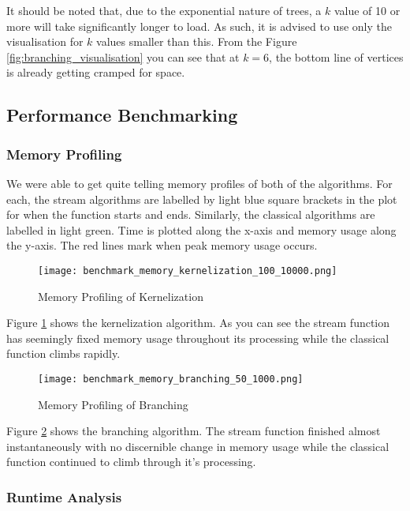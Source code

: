 It should be noted that, due to the exponential nature of trees, a \(k\) value
of 10 or more will take significantly longer to load. As such, it is advised to
use only the visualisation for \(k\) values smaller than this. From the Figure
\ref{fig:branching_visualisation} you can see that at \(k=6\), the bottom line
of vertices is already getting cramped for space.

\subsection{Performance Benchmarking}

\subsubsection{Memory Profiling}

We were able to get quite telling memory profiles of both of the algorithms.
For each, the stream algorithms are labelled by light blue square brackets in
the plot for when the function starts and ends. Similarly, the classical
algorithms are labelled in light green. Time is plotted along the x-axis and
memory usage along the y-axis. The red lines mark when peak memory usage occurs.

\begin{figure}[htb]
    \centering
    \texttt{[image: benchmark\_memory\_kernelization\_100\_10000.png]}
    \caption{Memory Profiling of Kernelization}
    \label{fig:benchmark_mem_kernelization}
\end{figure}

Figure \ref{fig:benchmark_mem_kernelization} shows the kernelization algorithm.
As you can see the stream function has seemingly fixed memory usage throughout
its processing while the classical function climbs rapidly.

\begin{figure}[htb]
    \centering
    \texttt{[image: benchmark\_memory\_branching\_50\_1000.png]}
    \caption{Memory Profiling of Branching}
    \label{fig:benchmark_mem_branching}
\end{figure}

Figure \ref{fig:benchmark_mem_branching} shows the branching algorithm. The
stream function finished almost instantaneously with no discernible change in
memory usage while the classical function continued to climb through it's
processing.

\subsubsection{Runtime Analysis}

